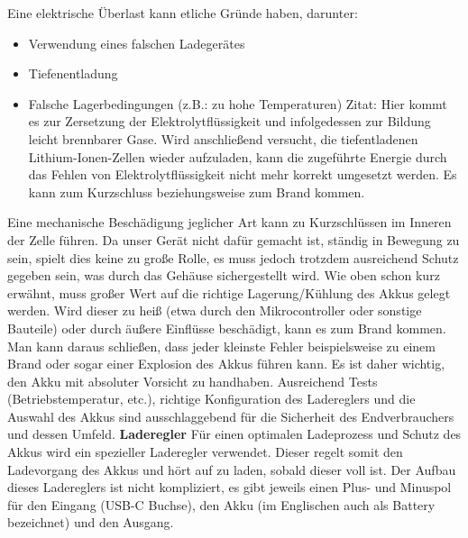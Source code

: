 \documentclass[11pt, twoside]{article}
\begin{document}
Eine elektrische Überlast kann etliche Gründe haben, darunter: 
\begin{itemize}
	\item Verwendung eines falschen Ladegerätes
	\item Tiefenentladung
	\item Falsche Lagerbedingungen (z.B.: zu hohe Temperaturen) 
\newline
Zitat: \glqq Hier kommt es zur Zersetzung der Elektrolytflüssigkeit und infolgedessen zur Bildung leicht brennbarer Gase. Wird anschließend versucht, die tiefentladenen Lithium-Ionen-Zellen wieder aufzuladen, kann die zugeführte Energie durch das Fehlen von Elektrolytflüssigkeit nicht mehr korrekt umgesetzt werden. Es kann zum Kurzschluss beziehungsweise zum Brand kommen.\grqq{} \parencite[][]{noauthor_urlnl11_nodate}
\end{itemize}
Eine mechanische Beschädigung jeglicher Art kann zu Kurzschlüssen im Inneren der Zelle führen. Da unser Gerät nicht dafür gemacht ist, ständig in Bewegung zu sein, spielt dies keine zu große Rolle, es muss jedoch trotzdem ausreichend Schutz gegeben sein, was durch das Gehäuse sichergestellt wird.
\vspace{4mm}\newline
Wie oben schon kurz erwähnt, muss großer Wert auf die richtige Lagerung/Kühlung des Akkus gelegt werden. Wird dieser zu heiß (etwa durch den Mikrocontroller oder sonstige Bauteile) oder durch äußere Einflüsse beschädigt, kann es zum Brand kommen.
\vspace{4mm}\newline
Man kann daraus schließen, dass jeder kleinste Fehler beispielsweise zu einem Brand oder sogar einer Explosion des Akkus führen kann. Es ist daher wichtig, den Akku mit absoluter Vorsicht zu handhaben. Ausreichend Tests (Betriebstemperatur, etc.), richtige Konfiguration des Ladereglers und die Auswahl des Akkus sind ausschlaggebend für die Sicherheit des Endverbrauchers und dessen Umfeld. \parencite[vgl.][]{noauthor_urlnl11_nodate}
\vspace{4mm}\newline
\textbf{Laderegler}\newline
Für einen optimalen Ladeprozess und Schutz des Akkus wird ein spezieller Laderegler verwendet. Dieser regelt somit den Ladevorgang des Akkus und hört auf zu laden, sobald dieser voll ist. Der Aufbau dieses Ladereglers ist nicht kompliziert, es gibt jeweils einen Plus- und Minuspol für den Eingang (USB-C Buchse), den Akku (im Englischen auch als Battery bezeichnet) und den Ausgang.
\end{document}
